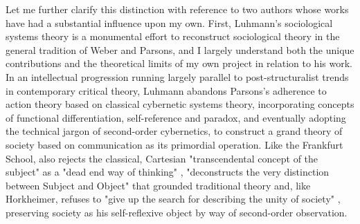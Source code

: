 Let me further clarify this distinction with reference to two authors whose works have had a substantial influence upon my own. First, Luhmann's sociological systems theory is a monumental effort to reconstruct sociological theory in the general tradition of Weber and Parsons, and I largely understand both the unique contributions and the theoretical limits of my own project in relation to his work. In an intellectual progression running largely parallel to post-structuralist trends in contemporary critical theory, Luhmann abandons Parsons's adherence to action theory based on classical cybernetic systems theory, incorporating concepts of functional differentiation, self-reference and paradox, and eventually adopting the technical jargon of second-order cybernetics, to construct a grand theory of society based on communication as its primordial operation. Like the Frankfurt School, \citeauthor{Luhmann1994-qz} also rejects the classical, Cartesian "transcendental concept of the subject" as a "dead end way of thinking" \autocite*[xli]{Luhmann1995-et}, "deconstructs the very distinction between Subject and Object" \autocite*[135]{Luhmann1994-qz} that grounded traditional theory and, like Horkheimer, refuses to "give up the search for describing the unity of society" \autocite[127]{Luhmann1994-qz}, preserving society as his self-reflexive object by way of second-order observation.

